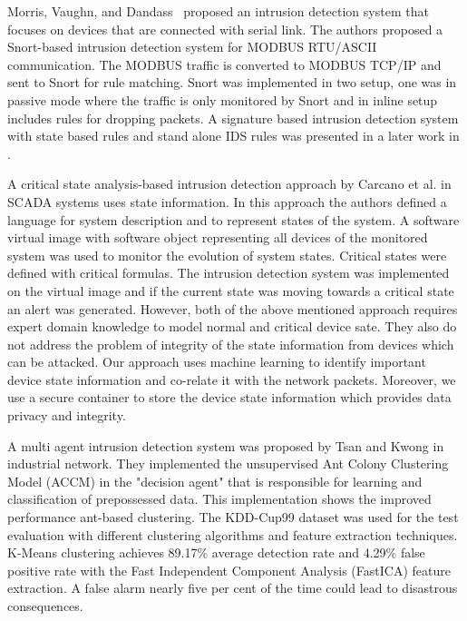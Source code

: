 \documentclass[conference]{IEEEtran}
\begin{document}
\par Morris, Vaughn, and Dandass~\cite{c2} proposed an intrusion detection system that focuses on devices that are connected with serial link. The authors proposed a Snort-based intrusion detection system for MODBUS RTU/ASCII communication. The MODBUS traffic is converted to MODBUS TCP/IP and sent to Snort for rule matching. Snort was implemented in two setup, one was in passive mode where the traffic is only monitored by Snort and in inline setup includes rules for dropping packets. 
A signature based intrusion detection system with state based rules and stand alone IDS rules was presented in a later work in \cite{c9}.
\par A critical state analysis-based intrusion detection approach by Carcano et al. \cite{c4} in SCADA systems uses state information. In this approach the authors defined a language for system description and to represent states of the system. A software virtual image with software object representing all devices of the monitored system was used to monitor the evolution of system states. Critical states were defined with critical formulas. The intrusion detection system was implemented on the virtual image and if the current state was moving towards a critical state an alert was generated.
However, both of the above mentioned approach requires expert domain knowledge to model normal and critical device sate. They also do not address the problem of integrity of the state information from devices which can be attacked. Our approach uses machine learning to identify important device state information and co-relate it with the network packets. Moreover, we use a secure container to store the device state information which provides data privacy and integrity.
\par A multi agent intrusion detection system was proposed by Tsan and Kwong \cite{c3} in industrial network. They implemented the unsupervised Ant Colony Clustering Model (ACCM) in the "decision agent" that is responsible for learning and classification of prepossessed data. This implementation shows the improved performance ant-based clustering. The KDD-Cup99 dataset was used for the test evaluation with different clustering algorithms and feature extraction techniques. K-Means clustering achieves 89.17\% average detection rate and  4.29\% false positive rate with the Fast Independent Component Analysis (FastICA) feature extraction. A false alarm nearly five per cent of the time could lead to disastrous consequences.
\end{document}

